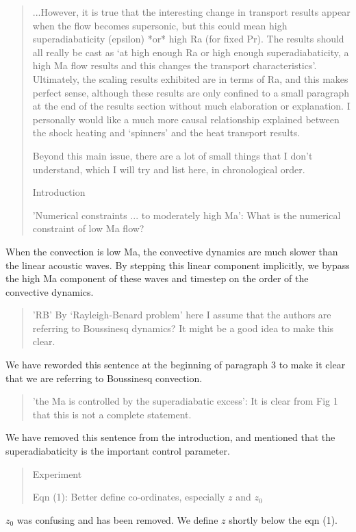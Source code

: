 \documentclass[aps, 11pt, singlecolumn]{revtex4-1} %
\begin{document}
\begin{singlespace}
\begin{quotation}
...However, it is true that the
interesting change in transport results appear when the flow becomes
supersonic, but this could mean high superadiabaticity (epsilon) *or*
high Ra (for fixed Pr). The results should all really be cast as
`at high enough Ra or high enough superadiabaticity, a high Ma flow
results and this changes the transport characteristics'.
Ultimately, the scaling results exhibited are in terms of Ra, and this
makes perfect sense, although these results are only confined to a
small paragraph at the end of the results section without much
elaboration or explanation. I personally would like a much more causal
relationship explained between the shock heating and `spinners'
and the heat transport results.

Beyond this main issue, there are a lot of small things that I don't
understand, which I will try and list here, in chronological order.

Introduction

'Numerical constraints ... to moderately high Ma': What is the
numerical constraint of low Ma flow?
\end{quotation}
When the convection is low Ma, the convective dynamics are much slower
than the linear acoustic waves.  By stepping this linear component
implicitly, we bypass the high Ma component of these waves and timestep
on the order of the convective dynamics.

\begin{quotation}
'RB' By `Rayleigh-Benard problem' here I assume that the
authors are referring to Boussinesq dynamics? It might be a good idea
to make this clear.
\end{quotation}
We have reworded this sentence at the beginning of paragraph 3 to make it
clear that we are referring to Boussinesq convection.

\begin{quotation}
'the Ma is controlled by the superadiabatic excess': It is clear
from Fig 1 that this is not a complete statement.
\end{quotation}
We have removed this sentence from the introduction, and mentioned that
the superadiabaticity is the important control parameter.

\begin{quotation}
Experiment

Eqn (1): Better define co-ordinates, especially $z$ and $z_0$
\end{quotation}
$z_0$ was confusing and has been removed.  We define $z$ shortly
below the eqn (1).


\end{singlespace}
\end{document}

